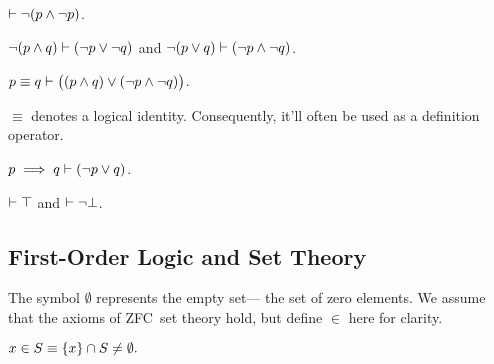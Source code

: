 \begin{definition}
  $\vdash \neg(p \land \neg p)$.
\end{definition}

\begin{definition}
  $\neg(p \land q) \vdash (\neg p \lor \neg q)$
    and $\neg(p \lor q) \vdash (\neg p \land \neg q)$.
\end{definition}

\indexsym{}
\begin{definition}
  $p\equiv q \vdash \big((p \land q) \lor (\neg p \land \neg q)\big)$.
\end{definition}

$\equiv$ denotes a logical identity.
Consequently,
  it'll often be used as a definition operator.

\begin{definition}[Implication]
  $p\implies q \vdash (\neg p \lor q)$.
\end{definition}

%
%
\begin{definition}
  $\vdash\top$ and $\vdash\neg\bot$.
\end{definition}


\subsection{First-Order Logic and Set Theory}
\indexsym{}
The symbol $\emptyset$ represents the empty set---%
  the set of zero elements.
We assume that the axioms of ZFC~set theory hold,
  but define $\in$ here for clarity.

\indexsym{}
\indexsym{}
\indexsym{}
\begin{definition}
  $x \in S \equiv \left\{x\right\} \cap S \not= \emptyset.$
\end{definition}

